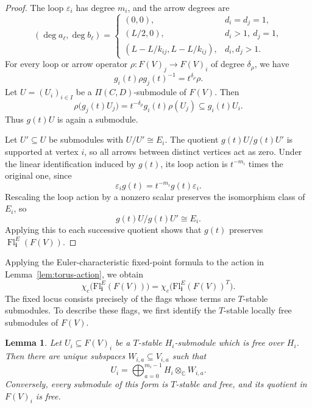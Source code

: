 \documentclass[12pt,reqno]{amsart}
\numberwithin{equation}{section}
\newtheorem{lemma}[theorem]{Lemma}
\theoremstyle{definition}
\theoremstyle{remark}
\newcommand{\Fl}{\operatorname{Fl}}
\theoremstyle{plain}
\theoremstyle{plain}
\begin{document}
\begin{proof}
    The loop $\varepsilon_i$ has degree $m_i$, and the arrow degrees are
\[
    (\deg a_\ell,\deg b_\ell)=
    \begin{cases}
        (0,0),
            & d_i=d_j=1,\\
        (L/2,0),
            & d_i>1,\ d_j=1,\\
        (L-L/k_{ij},L-L/k_{ij}),
            & d_i,d_j>1.
    \end{cases}
\]
For every loop or arrow operator $\rho\colon F(V)_j\to F(V)_i$ of degree $\delta_\rho$, we have
\[
    g_i(t)\rho g_j(t)^{-1}
    =t^{\delta_\rho}\rho.
\]
Let $U=(U_i)_{i\in I}$ be a
$\Pi(C,D)$-submodule of $F(V)$. Then
\[
    \rho\bigl(g_j(t)U_j\bigr)
    =
    t^{-\delta_\rho}g_i(t)\rho(U_j)
    \subseteq g_i(t)U_i.
\]
Thus $g(t)U$ is again a submodule.

Let $U'\subseteq U$ be submodules with $U/U'\cong E_i$. The quotient $g(t)U/g(t)U'$ is supported at vertex $i$, so all arrows between distinct vertices act as zero. Under the linear identification induced by $g(t)$, its loop action is $t^{-m_i}$ times the original one, since
\[
    \varepsilon_i g(t)
    =t^{-m_i}g(t) \varepsilon_i.
\]
Rescaling the loop action by a nonzero scalar preserves the isomorphism class of $E_i$, so
\[
    g(t)U/g(t)U'\cong E_i.
\]
Applying this to each successive quotient shows that $g(t)$ preserves $\Fl_{\mathbf i}^{E}(F(V))$.
\end{proof}

Applying the Euler-characteristic fixed-point formula \cite[Corollary~2]{BB73} to the action in Lemma~\ref{lem:torus-action}, we obtain
\begin{equation}\label{eq:euler-fixed}
    \chi_c\bigl(\mathrm{Fl}_{\mathbf i}^{E}(F(V))\bigr)
    =
    \chi_c\bigl(\mathrm{Fl}_{\mathbf i}^{E}(F(V))^T\bigr).
\end{equation}
The fixed locus consists precisely of the flags whose terms are $T$-stable submodules. To describe these flags, we first identify the $T$-stable locally free submodules of $F(V)$.

\begin{lemma}\label{lem:free}
Let $U_i\subseteq F(V)_i$ be a $T$-stable $H_i$-submodule which is free over $H_i$. Then there are unique subspaces $W_{i,a}\subseteq V_{i,a}$ such that
\[
    U_i=
    \bigoplus_{a=0}^{m_i-1}
    H_i\otimes_{\mathbb C}W_{i,a}.
\]
Conversely, every submodule of this form is $T$-stable and free, and its quotient in $F(V)_i$ is free.
\end{lemma}
\end{document}
